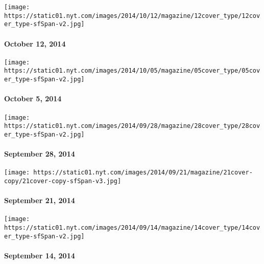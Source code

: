 \href{http://www.nytimes.com/indexes/2014/10/12/magazine/index.html}{}

\texttt{[image: https://static01.nyt.com/images/2014/10/12/magazine/12cover\_type/12cover\_type-sfSpan-v2.jpg]}

\hypertarget{october-12-2014}{%
\paragraph{October 12, 2014}\label{october-12-2014}}

\href{http://www.nytimes.com/indexes/2014/10/05/magazine/index.html}{}

\texttt{[image: https://static01.nyt.com/images/2014/10/05/magazine/05cover\_type/05cover\_type-sfSpan-v2.jpg]}

\hypertarget{october-5-2014}{%
\paragraph{October 5, 2014}\label{october-5-2014}}

\href{http://www.nytimes.com/indexes/2014/09/28/magazine/index.html}{}

\texttt{[image: https://static01.nyt.com/images/2014/09/28/magazine/28cover\_type/28cover\_type-sfSpan-v2.jpg]}

\hypertarget{september-28-2014}{%
\paragraph{September 28, 2014}\label{september-28-2014}}

\href{http://www.nytimes.com/indexes/2014/09/21/magazine/index.html}{}

\texttt{[image: https://static01.nyt.com/images/2014/09/21/magazine/21cover-copy/21cover-copy-sfSpan-v3.jpg]}

\hypertarget{september-21-2014}{%
\paragraph{September 21, 2014}\label{september-21-2014}}

\href{http://www.nytimes.com/indexes/2014/09/14/magazine/index.html}{}

\texttt{[image: https://static01.nyt.com/images/2014/09/14/magazine/14cover\_type/14cover\_type-sfSpan-v2.jpg]}

\hypertarget{september-14-2014}{%
\paragraph{September 14, 2014}\label{september-14-2014}}

